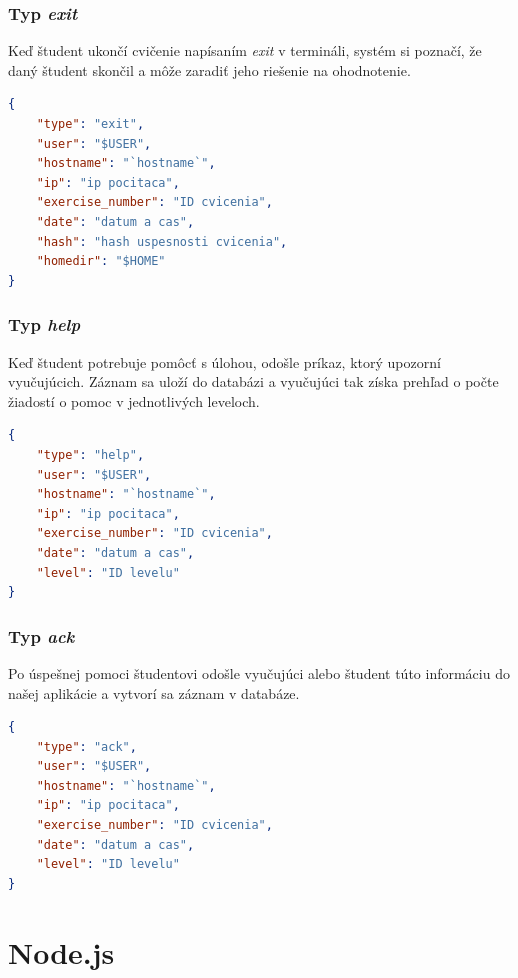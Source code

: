 \subsubsection{Typ \textit{exit}}
\label{sec:zbieraniedat:exit}

Keď študent ukončí cvičenie napísaním \textit{exit} v termináli,
systém si poznačí, že daný študent skončil a môže zaradiť jeho riešenie
na ohodnotenie.

\begin{lstlisting}[language=json,firstnumber=1]
{
    "type": "exit",
    "user": "$USER",
    "hostname": "`hostname`",
    "ip": "ip pocitaca",
    "exercise_number": "ID cvicenia",
    "date": "datum a cas",
    "hash": "hash uspesnosti cvicenia",
    "homedir": "$HOME"
}
\end{lstlisting}

\subsubsection{Typ \textit{help}}
\label{sec:zbieraniedat:help}

Keď študent potrebuje pomôcť s úlohou, odošle príkaz, ktorý upozorní vyučujúcich.
Záznam sa uloží do databázi a vyučujúci tak získa prehľad o počte žiadostí
o pomoc v jednotlivých leveloch.

\begin{lstlisting}[language=json,firstnumber=1]
{
    "type": "help",
    "user": "$USER",
    "hostname": "`hostname`",
    "ip": "ip pocitaca",
    "exercise_number": "ID cvicenia",
    "date": "datum a cas",
    "level": "ID levelu"
}
\end{lstlisting}

\subsubsection{Typ \textit{ack}}
\label{sec:zbieraniedat:ack}

Po úspešnej pomoci študentovi odošle vyučujúci alebo študent túto informáciu
do našej aplikácie a vytvorí sa záznam v databáze.

\begin{lstlisting}[language=json,firstnumber=1]
{
    "type": "ack",
    "user": "$USER",
    "hostname": "`hostname`",
    "ip": "ip pocitaca",
    "exercise_number": "ID cvicenia",
    "date": "datum a cas",
    "level": "ID levelu"
}
\end{lstlisting}

\section{Node.js}
\label{sec:nodejs}

